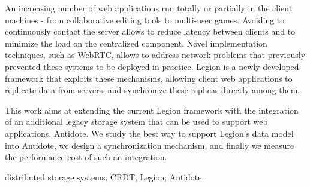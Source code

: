 An increasing number of web applications run totally or partially in the client machines - from collaborative editing tools to multi-user games. Avoiding to continuously contact the server allows to reduce latency between clients and to minimize the load on the centralized component. Novel implementation techniques, such as WebRTC, allows to address network problems that previously prevented these systems to be deployed in practice. Legion is a newly developed framework that exploits these mechanisms, allowing client web applications to replicate data from servers, and synchronize these replicas directly among them.\par
	This work aims at extending the current Legion framework with the integration of an additional legacy storage system that can be used to support web applications, Antidote. We study the best way to support Legion's data model into Antidote, we design a synchronization mechanism, and finally we measure the performance cost of such an integration.
	
\begin{keywords}
distributed storage systems; CRDT; Legion; Antidote.
\end{keywords} 

